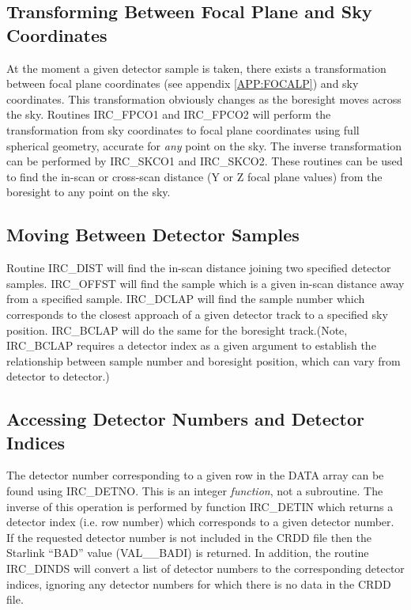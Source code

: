 \subsection {Transforming Between Focal Plane and Sky Coordinates}
At the moment a given detector sample is taken, there exists a transformation
between focal plane coordinates (see appendix \ref {APP:FOCALP}) and sky
coordinates. This transformation obviously changes as the boresight moves across
the sky. Routines IRC\_FPCO1 and IRC\_FPCO2 will perform the transformation from
sky coordinates to focal plane coordinates using full spherical geometry,
accurate for {\em any} point on the sky. The inverse transformation can be
performed by IRC\_SKCO1 and IRC\_SKCO2. These routines can be used to find the
in-scan or cross-scan distance (Y or Z focal plane values) from the boresight to
any point on the sky. 

\subsection {Moving Between Detector Samples}
Routine IRC\_DIST will find the in-scan distance joining two specified detector
samples. IRC\_OFFST will find the sample which is a given in-scan distance away
from a specified sample. IRC\_DCLAP will find the sample number which
corresponds to the closest approach of a given detector track to a specified sky
position. IRC\_BCLAP will do the same for the boresight track.(Note, IRC\_BCLAP
requires a detector index as a given argument to establish the relationship
between sample number and boresight position, which can vary from detector to
detector.) 

\subsection {Accessing Detector Numbers and Detector Indices}
The detector number corresponding to a given row in the DATA array can be found
using IRC\_DETNO. This is an integer {\em function}, not a subroutine. The
inverse of this operation is performed by function IRC\_DETIN which returns a
detector index (i.e. row number) which corresponds to a given detector number.
If the requested detector number is not included in the CRDD file then the
Starlink ``BAD'' value (VAL\_\_BADI) is returned. In addition, the routine
IRC\_DINDS will convert a list of detector numbers to the corresponding detector
indices, ignoring any detector numbers for which there is no data in the CRDD
file. 

